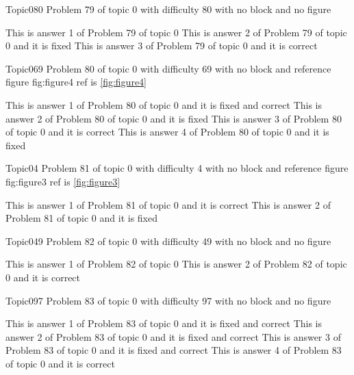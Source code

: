 \documentclass[master]{exam}
\begin{document}
\begin{problem}{Topic0}{80}
	Problem 79 of topic 0 with difficulty 80 with no block and no figure
	\begin{answers}
		\answer This is answer 1 of Problem 79 of topic 0 
		\answer[fixed] This is answer 2 of Problem 79 of topic 0 and it is fixed
		\answer[correct] This is answer 3 of Problem 79 of topic 0 and it is correct
	\end{answers}
\end{problem}

\begin{problem}{Topic0}{69}
	Problem 80 of topic 0 with difficulty 69 with no block and reference figure fig:figure4 ref is \ref{fig:figure4}
	\begin{answers}
		 This is answer 1 of Problem 80 of topic 0 and it is fixed and correct
		\answer[fixed] This is answer 2 of Problem 80 of topic 0 and it is fixed
		\answer[correct] This is answer 3 of Problem 80 of topic 0 and it is correct
		\answer[fixed] This is answer 4 of Problem 80 of topic 0 and it is fixed
	\end{answers}
\end{problem}

\begin{problem}{Topic0}{4}
	Problem 81 of topic 0 with difficulty 4 with no block and reference figure fig:figure3 ref is \ref{fig:figure3}
	\begin{answers}
		\answer[correct] This is answer 1 of Problem 81 of topic 0 and it is correct
		\answer[fixed] This is answer 2 of Problem 81 of topic 0 and it is fixed
	\end{answers}
\end{problem}

\begin{problem}{Topic0}{49}
	Problem 82 of topic 0 with difficulty 49 with no block and no figure
	\begin{answers}
		\answer This is answer 1 of Problem 82 of topic 0 
		\answer[correct] This is answer 2 of Problem 82 of topic 0 and it is correct
	\end{answers}
\end{problem}

\begin{problem}{Topic0}{97}
	Problem 83 of topic 0 with difficulty 97 with no block and no figure
	\begin{answers}
		 This is answer 1 of Problem 83 of topic 0 and it is fixed and correct
		 This is answer 2 of Problem 83 of topic 0 and it is fixed and correct
		 This is answer 3 of Problem 83 of topic 0 and it is fixed and correct
		\answer[correct] This is answer 4 of Problem 83 of topic 0 and it is correct
	\end{answers}
\end{problem}
\end{document}
